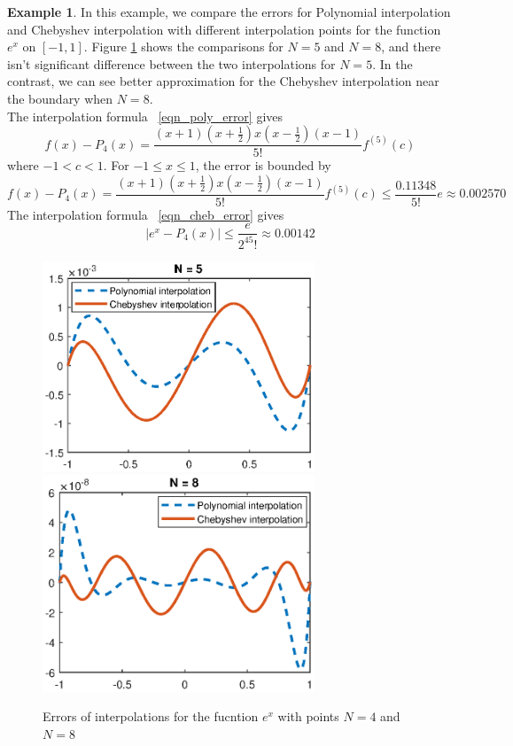\documentclass[11pt]{amsart}
\theoremstyle{definition}
\newtheorem{exmp}{Example}[section]
\begin{document}
\begin{exmp}
In this example, we compare the errors for Polynomial interpolation and Chebyshev interpolation with different interpolation points for the function $e^x$ on $[-1,1]$. Figure \ref{fig:e1} shows the comparisons for $N=5$ and $N=8$, and there isn't significant difference between the two interpolations for $N=5$. In the contrast, we can see better approximation for the Chebyshev interpolation near the boundary when  $N=8$.\\
The interpolation formula ~\eqref{eqn_poly_error} gives 
\begin{equation}
f(x)-P_4(x)=\frac{(x+1)(x+\frac{1}{2})x(x-\frac{1}{2})(x-1)}{5!}f^{(5)}(c)
\end{equation}
where $-1<c<1$. For $-1\leq x\leq 1$, the error is bounded by
\begin{equation*}
f(x)-P_4(x)=\frac{(x+1)(x+\frac{1}{2})x(x-\frac{1}{2})(x-1)}{5!}f^{(5)}(c)\leq \frac{0.11348}{5!}e\approx 0.002570
\end{equation*}
The interpolation formula ~\eqref{eqn_cheb_error} gives 
\begin{equation*}
|e^x-P_4(x)|\leq \frac{e}{2^45!}\approx 0.00142
\end{equation*}

\begin{figure}     	\centerline{\includegraphics[width=3.2in]{./figs/e1a.eps}
      	\hspace{-6pt}
     	\includegraphics[width=3.2in]{./figs/e1b.eps}}
     	\hspace{-6pt}
		\caption{Errors of interpolations for the fucntion $e^x$ with points $N=4$ and $N=8$}
        \label{fig:e1}
\end{figure}
\end{exmp}
\end{document}
